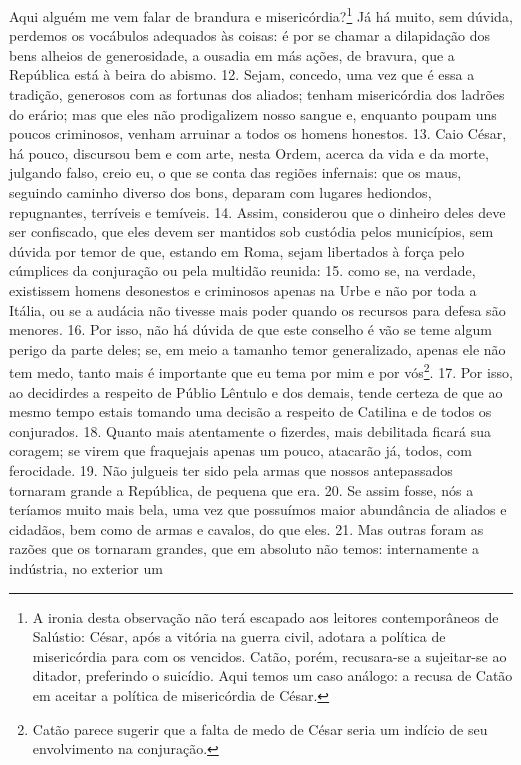 Aqui alguém me vem falar de brandura e misericórdia?\footnote{A ironia desta
observação não terá escapado aos leitores contemporâneos de Salústio: César,
após a vitória na guerra civil, adotara a política de misericórdia para com os
vencidos. Catão, porém, recusara-se a sujeitar-se ao ditador, preferindo o
suicídio. Aqui temos um caso análogo: a recusa de Catão em aceitar a política
de misericórdia de César.} Já há muito, sem dúvida, perdemos os vocábulos
adequados às coisas: é por se chamar a dilapidação dos bens alheios de
generosidade, a ousadia em más ações, de bravura, que a República está à beira
do abismo. 12. Sejam, concedo, uma vez que é essa a tradição, generosos com as
fortunas dos aliados; tenham misericórdia dos ladrões do erário; mas que eles
não prodigalizem nosso sangue e, enquanto poupam uns poucos criminosos, venham
arruinar a todos os homens honestos. 13. Caio César, há pouco, discursou bem e
com arte, nesta Ordem, acerca da vida e
da morte, julgando falso, creio eu, o que se conta das regiões infernais: que
os maus, seguindo caminho diverso dos bons, deparam com lugares hediondos,
repugnantes, terríveis e temíveis. 14. Assim, considerou que o dinheiro deles deve
ser confiscado, que eles devem ser mantidos sob custódia pelos
municípios, sem dúvida por temor de que, estando em Roma, sejam libertados à
força pelo cúmplices da conjuração ou pela multidão reunida: 15. como se, na
verdade, existissem homens desonestos e criminosos apenas na Urbe e não por
toda a Itália, ou se a audácia não tivesse mais poder quando os recursos para
defesa são menores. 16. Por isso, não há dúvida de que este conselho é vão se
teme algum perigo da parte deles; se, em meio a tamanho temor generalizado,
apenas ele não tem medo, tanto mais é importante que eu tema por mim e por vós\footnote{Catão parece sugerir que a falta de medo de César seria um indício de seu
envolvimento na conjuração.}. 17. Por isso, ao decidirdes a respeito de Públio
Lêntulo e dos demais, tende certeza de que ao mesmo tempo estais tomando uma
decisão a respeito de Catilina e de todos os conjurados. 18. Quanto mais
atentamente o fizerdes, mais debilitada ficará sua coragem; se virem que
fraquejais apenas um pouco, atacarão já, todos, com ferocidade. 19. Não
julgueis ter sido pela armas que nossos antepassados tornaram grande a
República, de pequena que era. 20. Se assim fosse, nós a teríamos muito mais
bela, uma vez que possuímos maior abundância de aliados e cidadãos, bem como de
armas e cavalos, do que eles. 21. Mas outras foram as razões que os tornaram
grandes, que em absoluto não temos: internamente a indústria, no exterior um
